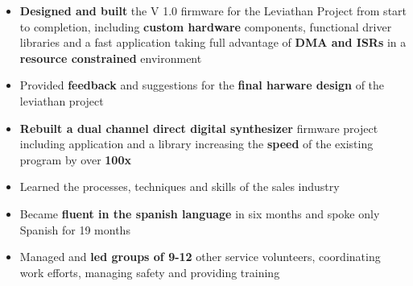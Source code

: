     \begin{itemize}
        \item \textbf{Designed and built} the V 1.0 firmware for the Leviathan
            Project from start to completion, including \textbf{custom
            hardware} components, functional driver libraries and a
            fast application taking full advantage of \textbf{DMA and ISRs} in a
            \textbf{resource constrained} environment
        \item Provided \textbf{feedback} and suggestions for the \textbf{final
            harware design} of the leviathan project
        \item \textbf{Rebuilt a dual channel direct digital synthesizer}
            firmware project including application and a library increasing the
            \textbf{speed} of the existing program by over \textbf{100x}
            \smallskip

    \end{itemize}

	\divider

	\begin{itemize}
		\item Learned the processes, techniques and skills of the sales industry
	\end{itemize}

	\divider

	\begin{itemize}
        \item Became \textbf{fluent in the spanish language} in six months and spoke
			only Spanish for 19 months
			\smallskip
        \item Managed and \textbf{led groups of 9-12} other service volunteers, coordinating work
			efforts, managing safety and providing training
	\end{itemize}






